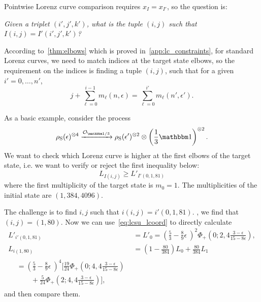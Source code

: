 Pointwise Lorenz curve comparison requires $x_{I} = x_{I'}$, so the question is: 
\begin{center}
\emph{Given a triplet $(i',j',k')$, what is the tuple $(i,j)$ such that $I(i,j) = I'(i',j',k')$?}
\end{center}

According to~\cref{thm:elbows} which is proved in~\cref{app:lc_constraints}, for standard Lorenz curves, we need to match indices at the target state elbows, so the requirement on the indices is finding a tuple $(i, j)$, such that for a given $i' = 0,\dots,n'$,
\begin{equation}
	j + \sum_{\ell=0}^{i-1} m_{\ell}(n, \epsilon) = \sum_{\ell=0}^{i'} m_{\ell}(n', \epsilon').
\end{equation}

As a basic example, consider the process 
\begin{equation}
\rho_{\rm{S}}(\epsilon)^{\otimes 4} \xrightarrow{\mathcal{O}_{\id/3}} \rho_{\rm{S}}(\epsilon')^{\otimes 2} \otimes \left( \frac{1}{3}\id \right)^{\otimes 2}.
\end{equation}
We want to check which Lorenz curve is higher at the first elbows of the target state, i.e. we want to verify or reject the first inequality below:
\begin{equation}
	L_{I(i,j)} \geq L'_{I'(0, 1, 81)}
\end{equation}
where the first multiplicity of the target state is $m_0 = 1$.
The multiplicities of the initial state are $(1, 384, 4096)$.

The challenge is to find $i,j$ such that $i(i,j) = i'(0,1,81)$.
, we find that $(i,j) = (1, 80)$.
Now we can use~\cref{eq:lcsu_lcoord} to directly calculate
\begin{align*}
	L'_{i'(0,1,81)} &= L'_0 = \left( \frac{5}{3} - \frac{8}{9}\epsilon\ \right)^2 \Phi_+\left(0;2,4\frac{3-\epsilon}{15-8\epsilon}\right), \\
	L_{i(1, 80)} &= \left(1-\frac{80}{384} \right) L_0 + \frac{80}{384} L_1 \\
	\begin{split}
	&= \left( \frac{5}{3} - \frac{8}{9}\epsilon\ \right)^4 \bigg[ \frac{19}{24} \Phi_+\left(0;4,4\frac{3-\epsilon}{15-8\epsilon}\right) \\ 
	&\qquad + \frac{5}{24}\Phi_+\left(2;4,4\frac{3-\epsilon}{15-8\epsilon}\right) \bigg],
	\end{split}
\end{align*}
and then compare them.

